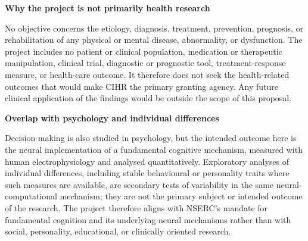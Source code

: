 \documentclass[12pt,letterpaper]{article}
\newcommand{\eligsection}[1]{\Needspace{2\baselineskip}\vspace{3pt}\noindent\textbf{#1}\par\vspace{0pt}}
\begin{document}
\eligsection{Why the project is not primarily health research}
No objective concerns the etiology, diagnosis, treatment, prevention, prognosis, or rehabilitation of any physical or mental disease, abnormality, or dysfunction. The project includes no patient or clinical population, medication or therapeutic manipulation, clinical trial, diagnostic or prognostic tool, treatment-response measure, or health-care outcome. It therefore does not seek the health-related outcomes that would make CIHR the primary granting agency. Any future clinical application of the findings would be outside the scope of this proposal.

\eligsection{Overlap with psychology and individual differences}
Decision-making is also studied in psychology, but the intended outcome here is the neural implementation of a fundamental cognitive mechanism, measured with human electrophysiology and analysed quantitatively. Exploratory analyses of individual differences, including stable behavioural or personality traits where such measures are available, are secondary tests of variability in the same neural-computational mechanism; they are not the primary subject or intended outcome of the research. The project therefore aligns with NSERC's mandate for fundamental cognition and its underlying neural mechanisms rather than with social, personality, educational, or clinically oriented research.
\end{document}
